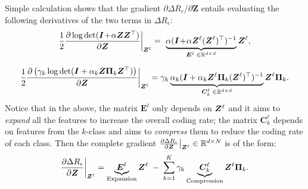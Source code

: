 \documentclass[\toplevelprefix/book-main.tex]{subfiles}
\begin{document}
Simple calculation shows that the gradient ${\partial \Delta R_{\epsilon}}/{\partial \bm Z}$ entails evaluating the following derivatives of the two terms in $\Delta R_{\epsilon}$:
\begin{equation}\label{eqn:expand-directions}
    \frac{1}{2}\frac{\partial \log \det (\bm{I} \!+\! \alpha \bm{Z} \bm{Z}^{\top} )}{\partial \bm Z}\bigg|_{\bm{Z}^\ell} = \,\, \underbrace{\alpha(\bm{I} \!+\! \alpha\bm{Z}^\ell (\bm{Z}^\ell)^\top)^{-1}}_{\bm E^{\ell} \; \in \mathbb{R}^{d\times d}}\bm{Z}^\ell,
\end{equation}

\begin{equation}\label{eqn:compress-directions}
\frac{1}{2}\frac{\partial \left( \gamma_{k}  \log \det (\bm{I} + \alpha_{k} \bm{Z} \bm \Pi_k \bm{Z}^{\top} )  \right)}{\partial \bm Z}\bigg|_{\bm{Z}^\ell} \\= \gamma_{k}  \underbrace{ \alpha_{k}  (\bm{I} +  \alpha_{k} \bm{Z}^\ell \bm \Pi_k (\bm{Z}^\ell)^{\top})^{-1}}_{\bm C^{\ell}_k \; \in \mathbb{R}^{d\times d}} \bm{Z}^{\ell} \bm \Pi_k.
\end{equation}
Notice that in the above, the matrix $\bm E^{\ell}$  only depends on $\bm{Z}^{\ell}$ and it aims to {\em expand} all the features to increase the overall coding rate; the matrix $\bm C^{\ell}_{k}$ depends on features from the $k$-class and aims to {\em compress} them to reduce the coding rate of each class. 
Then the complete gradient $\frac{\partial \Delta R_{\epsilon}}{\partial \bm Z}\big|_{\bm{Z}^\ell} \in \mathbb{R}^{d\times N}$ is of the  form:
\begin{equation}
\frac{\partial \Delta R_{\epsilon}}{\partial \bm Z}\bigg|_{\bm{Z}^\ell}  = \underbrace{\bm E^{\ell}}_{\text{Expansion}} \bm{Z}^{\ell} \;-\; \sum_{k=1}^K \gamma_{k} \underbrace{\bm C_{k}^{\ell}}_{\text{Compression}}  \bm{Z}^{\ell} \bm{\Pi}_k.
\label{eqn:DR-gradient}
\end{equation}
\end{document}
